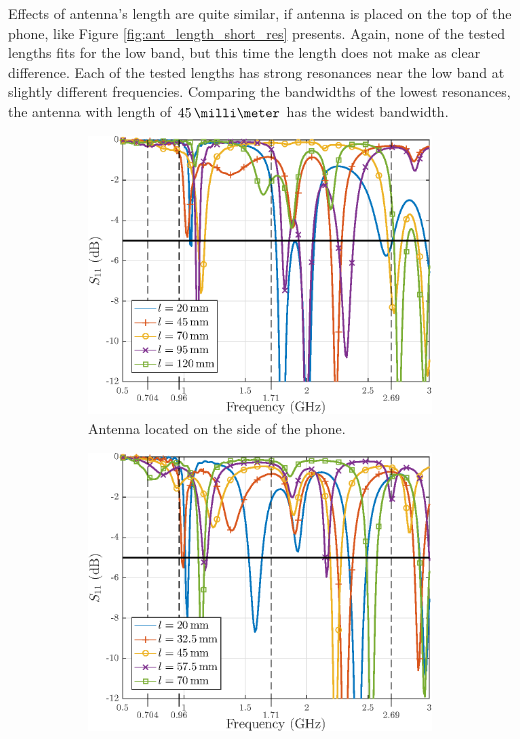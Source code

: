 Effects of antenna's length are quite similar, if antenna is placed on the top of the phone, like Figure \ref{fig:ant_length_short_res} presents. Again, none of the tested lengths fits for the low band, but this time the length does not make as clear difference. Each of the tested lengths has strong resonances near the low band at slightly different frequencies. Comparing the bandwidths of the lowest resonances, the antenna with length of $45\,\milli\meter$ has the widest bandwidth.

\begin{figure}[H]
    \centering
    \begin{subfigure}[b]{0.49\textwidth}
        \includegraphics[width=\textwidth]{img/ant_length_long_res.eps}
        \caption{Antenna located on the side of the phone.}
        \label{fig:ant_length_long_res}
    \end{subfigure}
    \begin{subfigure}[b]{0.49\textwidth}
        \includegraphics[width=\textwidth]{img/ant_length_short_res.eps}

\end{subfigure}
\end{figure}

